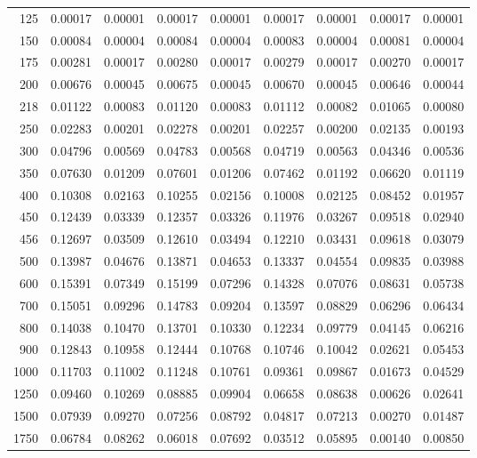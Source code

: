 \begin{table}[ht]
\begin{tabular}{r|c|c|c|c|c|c|c|c}
      125 & 0.00017 & 0.00001 & 0.00017 & 0.00001 & 0.00017 & 0.00001 & 0.00017 & 0.00001 \\
      150 & 0.00084 & 0.00004 & 0.00084 & 0.00004 & 0.00083 & 0.00004 & 0.00081 & 0.00004 \\
      175 & 0.00281 & 0.00017 & 0.00280 & 0.00017 & 0.00279 & 0.00017 & 0.00270 & 0.00017 \\
      200 & 0.00676 & 0.00045 & 0.00675 & 0.00045 & 0.00670 & 0.00045 & 0.00646 & 0.00044 \\
      218 & 0.01122 & 0.00083 & 0.01120 & 0.00083 & 0.01112 & 0.00082 & 0.01065 & 0.00080 \\
      250 & 0.02283 & 0.00201 & 0.02278 & 0.00201 & 0.02257 & 0.00200 & 0.02135 & 0.00193 \\
      300 & 0.04796 & 0.00569 & 0.04783 & 0.00568 & 0.04719 & 0.00563 & 0.04346 & 0.00536 \\
      350 & 0.07630 & 0.01209 & 0.07601 & 0.01206 & 0.07462 & 0.01192 & 0.06620 & 0.01119 \\
      400 & 0.10308 & 0.02163 & 0.10255 & 0.02156 & 0.10008 & 0.02125 & 0.08452 & 0.01957 \\
      450 & 0.12439 & 0.03339 & 0.12357 & 0.03326 & 0.11976 & 0.03267 & 0.09518 & 0.02940 \\
      456 & 0.12697 & 0.03509 & 0.12610 & 0.03494 & 0.12210 & 0.03431 & 0.09618 & 0.03079 \\
      500 & 0.13987 & 0.04676 & 0.13871 & 0.04653 & 0.13337 & 0.04554 & 0.09835 & 0.03988 \\
      600 & 0.15391 & 0.07349 & 0.15199 & 0.07296 & 0.14328 & 0.07076 & 0.08631 & 0.05738 \\
      700 & 0.15051 & 0.09296 & 0.14783 & 0.09204 & 0.13597 & 0.08829 & 0.06296 & 0.06434 \\
      800 & 0.14038 & 0.10470 & 0.13701 & 0.10330 & 0.12234 & 0.09779 & 0.04145 & 0.06216 \\
      900 & 0.12843 & 0.10958 & 0.12444 & 0.10768 & 0.10746 & 0.10042 & 0.02621 & 0.05453 \\
     1000 & 0.11703 & 0.11002 & 0.11248 & 0.10761 & 0.09361 & 0.09867 & 0.01673 & 0.04529 \\
     1250 & 0.09460 & 0.10269 & 0.08885 & 0.09904 & 0.06658 & 0.08638 & 0.00626 & 0.02641 \\
     1500 & 0.07939 & 0.09270 & 0.07256 & 0.08792 & 0.04817 & 0.07213 & 0.00270 & 0.01487 \\
     1750 & 0.06784 & 0.08262 & 0.06018 & 0.07692 & 0.03512 & 0.05895 & 0.00140 & 0.00850 \\

\end{tabular}
\end{table}

